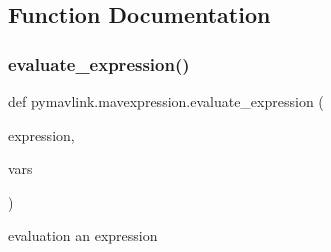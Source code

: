 \subsection{Function Documentation}
\mbox{\label{namespacepymavlink_1_1mavexpression_a8fee43c3020a15e908bbd7c6bce1e7ca}} 
\subsubsection{\texorpdfstring{evaluate\+\_\+expression()}{evaluate\_expression()}}
{\footnotesize\ttfamily def pymavlink.\+mavexpression.\+evaluate\+\_\+expression (\begin{DoxyParamCaption}\item[{}]{expression,  }\item[{}]{vars }\end{DoxyParamCaption})}

\begin{DoxyVerb}evaluation an expression\end{DoxyVerb}
 